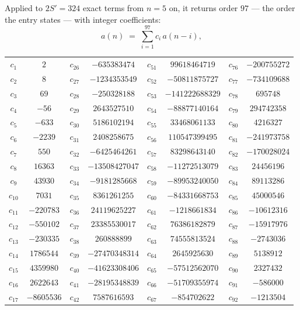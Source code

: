 \documentclass[11pt,a4paper]{article}
\theoremstyle{plain}
\theoremstyle{definition}
\begin{document}
Applied to $2S'=324$ exact terms from $n=5$ on, it returns order $97$ --- the
order the entry states --- with integer coefficients:
\[
a(n)\;=\;\sum_{i=1}^{97}c_i\,a(n-i),
\]
\begin{center}\small
\begin{tabular}{cccccccc}
$c_{1}$ & $2$ & $c_{26}$ & $-635383474$ & $c_{51}$ & $99618464719$ & $c_{76}$ & $-200755272$ \\
$c_{2}$ & $8$ & $c_{27}$ & $-1234353549$ & $c_{52}$ & $-50811875727$ & $c_{77}$ & $-734109688$ \\
$c_{3}$ & $69$ & $c_{28}$ & $-250328188$ & $c_{53}$ & $-141222688329$ & $c_{78}$ & $695748$ \\
$c_{4}$ & $-56$ & $c_{29}$ & $2643527510$ & $c_{54}$ & $-88877140164$ & $c_{79}$ & $294742358$ \\
$c_{5}$ & $-633$ & $c_{30}$ & $5186102194$ & $c_{55}$ & $33468061133$ & $c_{80}$ & $4216327$ \\
$c_{6}$ & $-2239$ & $c_{31}$ & $2408258675$ & $c_{56}$ & $110547399495$ & $c_{81}$ & $-241973758$ \\
$c_{7}$ & $550$ & $c_{32}$ & $-6425464261$ & $c_{57}$ & $83298643140$ & $c_{82}$ & $-170028024$ \\
$c_{8}$ & $16363$ & $c_{33}$ & $-13508427047$ & $c_{58}$ & $-11272513079$ & $c_{83}$ & $24456196$ \\
$c_{9}$ & $43930$ & $c_{34}$ & $-9181285668$ & $c_{59}$ & $-89953240050$ & $c_{84}$ & $89113286$ \\
$c_{10}$ & $7031$ & $c_{35}$ & $8361261255$ & $c_{60}$ & $-84331668753$ & $c_{85}$ & $45000546$ \\
$c_{11}$ & $-220783$ & $c_{36}$ & $24119625227$ & $c_{61}$ & $-1218661834$ & $c_{86}$ & $-10612316$ \\
$c_{12}$ & $-550102$ & $c_{37}$ & $23385530017$ & $c_{62}$ & $76386182879$ & $c_{87}$ & $-15917976$ \\
$c_{13}$ & $-230335$ & $c_{38}$ & $260888899$ & $c_{63}$ & $74555813524$ & $c_{88}$ & $-2743036$ \\
$c_{14}$ & $1786544$ & $c_{39}$ & $-27470348314$ & $c_{64}$ & $2645925630$ & $c_{89}$ & $5138912$ \\
$c_{15}$ & $4359980$ & $c_{40}$ & $-41623308406$ & $c_{65}$ & $-57512562070$ & $c_{90}$ & $2327432$ \\
$c_{16}$ & $2622643$ & $c_{41}$ & $-28195348839$ & $c_{66}$ & $-51709355974$ & $c_{91}$ & $-586000$ \\
$c_{17}$ & $-8605536$ & $c_{42}$ & $7587616593$ & $c_{67}$ & $-854702622$ & $c_{92}$ & $-1213504$ \\

\end{tabular}
\end{center}
\end{document}
